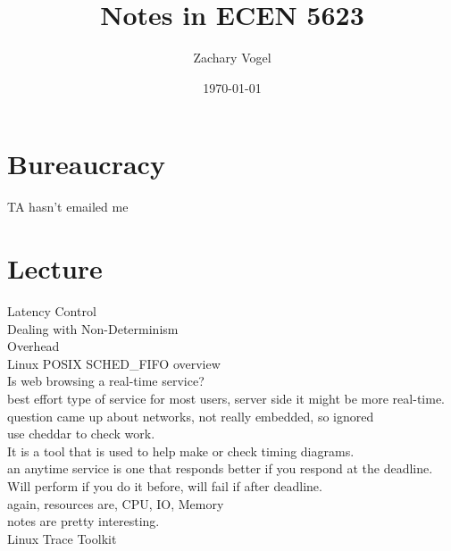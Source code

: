 \documentclass{article}
\author{Zachary Vogel}
\date{\today}
\title{Notes in ECEN 5623}
\begin{document}
\maketitle


\section*{Bureaucracy}
TA hasn't emailed me\\

\section*{Lecture}
Latency Control\\
Dealing with Non-Determinism\\
Overhead\\

Linux POSIX SCHED\_FIFO overview\\

Is web browsing a real-time service?\\
best effort type of service for most users, server side it might be more real-time.\\
question came up about networks, not really embedded, so ignored\\

use cheddar to check work.\\
It is a tool that is used to help make or check timing diagrams.\\
an anytime service is one that responds better if you respond at the deadline. Will perform if you do it before, will fail if after deadline.\\


again, resources are, CPU, IO, Memory\\

notes are pretty interesting.\\


Linux Trace Toolkit\\
\end{document}
